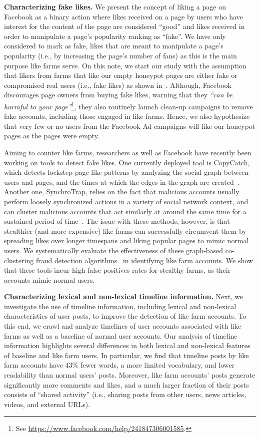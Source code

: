 \documentclass[twocolumn,10pt,letterpaper]{article}
\newcommand{\descr}[1]{\smallskip\noindent\textbf{#1}}
\begin{document}
\descr{Characterizing fake likes.} We present the concept of liking a page on Facebook as a binary action where likes received on a page by users who have interest for the content of the page are considered ``good'' and likes received in order to manipulate a page's popularity ranking as ``fake''. We have only considered to mark as fake, likes that are meant to manipulate a page's popularity (i.e., by increasing the page's number of fans) as this is the main purpose like farms serve. On this note, we start our study with the assumption that likers from farms that like our empty honeypot pages are either fake or compromised real users (i.e., fake likes) as shown in~\cite{viswanath14tanomaloussocialnetwork}. Although, Facebook discourages page owners from buying fake likes, warning that they {\em ``can be harmful to your page''}\footnote{See \url{https://www.facebook.com/help/241847306001585}.}, they also routinely launch clean-up campaigns to remove fake accounts, including those engaged in like farms. Hence, we also hypothesize that very few or no users from the Facebook Ad campaigns will like our honeypot pages as the pages were empty. 


Aiming to counter like farms, researchers as well as Facebook have recently been working on tools to detect fake likes. One currently deployed tool is CopyCatch, which detects lockstep page like patterns by analyzing the social graph between users and pages, and the times at which the edges in the graph are created~\cite{beutel2013copycatch}. Another one, SynchroTrap, relies on the fact that malicious accounts usually perform loosely synchronized actions in a variety of social network context, and can cluster malicious accounts that act similarly at around the same time for a sustained period of time~\cite{cao14synchrotrap}. The issue with these methods, however, is that stealthier (and more expensive) like farms can successfully circumvent them by spreading likes over longer timespans and liking popular pages to mimic normal users.
%
We systematically evaluate the effectiveness of these graph-based co-clustering fraud detection algorithms~\cite{beutel2013copycatch,cao14synchrotrap} in identifying like farm accounts. We show that these tools incur  high false positives rates for stealthy farms, as their accounts mimic normal users.

\descr{Characterizing lexical and non-lexical timeline information.} Next, we investigate the use of timeline information, including lexical and non-lexical characteristics of user posts, to improve the detection of like farm accounts. To this end, we crawl and analyze timelines of user accounts associated with like farms as well as a baseline of normal user accounts. Our analysis of timeline information highlights several differences in both lexical and non-lexical features of baseline and like farm users. In particular, we find that timeline posts by like farm accounts have 43\% fewer words, a more limited vocabulary, and lower readability than normal users' posts. Moreover, like farm accounts' posts generate significantly more comments and likes, and a much larger fraction of their posts consists of ``shared activity'' (i.e., sharing posts from other users, news articles, videos, and external URLs).
\end{document}
